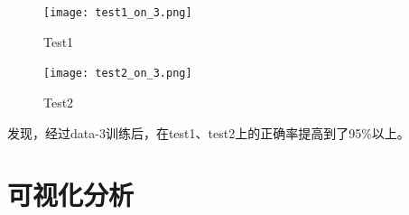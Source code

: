 \documentclass[12pt, a4paper, oneside]{ctexart}
\begin{document}
\begin{figure}[H]  
    \begin{minipage}[H]{0.5\linewidth} %
            \centering
            \texttt{[image: test1\_on\_3.png]}
            \caption{Test1}
     \end{minipage}
     \begin{minipage}[H]{0.5\linewidth} %
         \hspace{2mm}%
         \texttt{[image: test2\_on\_3.png]}
         \caption{Test2}
      \end{minipage}
\end{figure}
发现，经过data-3训练后，在test1、test2上的正确率提高到了95\%以上。



\section{可视化分析}
\end{document}
